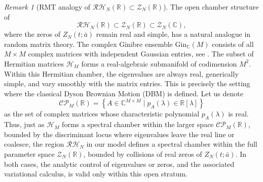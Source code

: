\documentclass[12pt,reqno]{amsart}
\theoremstyle{plain}
\theoremstyle{definition}
\theoremstyle{remark}
\newtheorem{rem}{Remark}[section]       %
\begin{document}
\begin{rem}[RMT analogy of $\mathcal{RH}_N (\mathbb{R}) \subset \mathcal{Z}_N(\mathbb{R})$]
\label{rem:3.3}
The open chamber structure of 
\begin{equation}
\mathcal{RH}_N (\mathbb{R}) \subset \mathcal{Z}_N(\mathbb{R}) \subset \mathcal{Z}_N(\mathbb{C}),
\end{equation} where the zeros of $Z_N(t; \bar{a})$ remain real and simple, has a natural analogue in random matrix theory. The complex Ginibre ensemble $\mathrm{Gin}_\mathbb{C}(M)$ consists of all $M \times M$ complex matrices with independent Gaussian entries, see \cite{Gin}. The subset of Hermitian matrices $\mathcal{H}_M$ forms a real-algebraic submanifold of codimension $M^2$. Within this Hermitian chamber, the eigenvalues are always real, generically simple, and vary smoothly with the matrix entries. This is precisely the setting where the classical Dyson Brownian Motion (DBM) is defined. Let us denote
\begin{equation}
\mathcal{CP}_M(\mathbb{R}) = \left\{ A \in \mathbb{C}^{M \times M} \mid p_A(\lambda) \in \mathbb{R}[\lambda] \right\}
\end{equation}
as the set of complex matrices whose characteristic polynomial $p_A(\lambda)$ is real. Thus, just as $\mathcal{H}_M$ forms a spectral chamber within the larger space $\mathcal{CP}_M(\mathbb{R})$, bounded by the discriminant locus where eigenvalues leave the real line or coalesce, the region $\mathcal{RH}_N$ in our model defines a spectral chamber within the full parameter space $\mathcal{Z}_N(\mathbb{R})$, bounded by collisions of real zeros of $Z_N(t; \bar{a})$. In both cases, the analytic control of eigenvalues or zeros, and the associated variational calculus, is valid only within this open stratum.
\end{rem}
\end{document}
